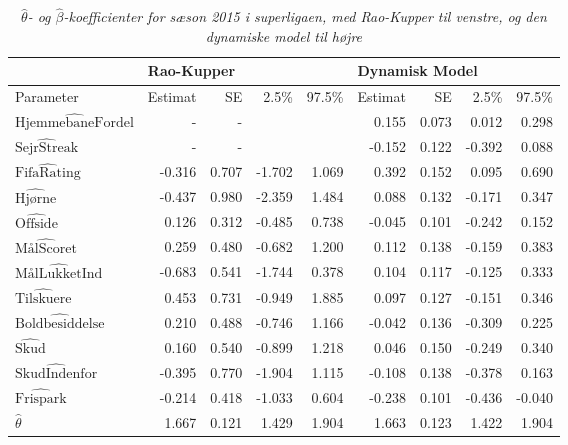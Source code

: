 \documentclass[11pt,a4paper]{article}
\begin{document}
  \begin{table}[ht]
\centering
\begin{adjustbox}{max width=\textwidth}
\begin{tabular}{|l|rrrr|rrrr|}
\hline
\multicolumn{1}{|l|}{} & \multicolumn{4}{l|}{Rao-Kupper} & \multicolumn{4}{l|}{Dynamisk Model} \\
\hline
Parameter & Estimat & SE &2.5\% &97.5\% & Estimat & SE &2.5\% &97.5\%\\
  \hline
    $\hat{\text{HjemmebaneFordel}}$ & -      & -     &      &            & 0.155 & 0.073  &0.012 & 0.298  \\
    $\hat{\text{SejrStreak}}$       & -      & -     &       &           & -0.152 & 0.122 &-0.392 & 0.088 \\
    $\hat{\text{FifaRating}}$       & -0.316 & 0.707 &-1.702 &1.069      & 0.392 & 0.152  &0.095 & 0.690 \\
    $\hat{\text{Hjørne}}$           & -0.437 & 0.980 &-2.359 &1.484      & 0.088 & 0.132  &-0.171 &0.347\\
    $\hat{\text{Offside}}$          &  0.126 & 0.312 &-0.485 &0.738      & -0.045 & 0.101 &-0.242 &0.152 \\
    $\hat{\text{MålScoret}}$        &  0.259 & 0.480 &-0.682 &1.200      & 0.112 & 0.138  &-0.159 &0.383\\
    $\hat{\text{MålLukketInd}}$     & -0.683 & 0.541 &-1.744 &0.378      & 0.104 & 0.117  &-0.125 & 0.333\\
    $\hat{\text{Tilskuere}}$        &  0.453 & 0.731 &-0.949&1.885       & 0.097 & 0.127 &-0.151 & 0.346\\
    $\hat{\text{Boldbesiddelse}}$   &  0.210 & 0.488 &-0.746 &1.166      & -0.042 & 0.136 &-0.309 & 0.225\\
    $\hat{\text{Skud}}$             &  0.160 & 0.540 &-0.899 &1.218      & 0.046 & 0.150 &-0.249 & 0.340\\
    $\hat{\text{SkudIndenfor}}$     & -0.395 & 0.770 &-1.904 &1.115      & -0.108 & 0.138 &-0.378 & 0.163\\
    $\hat{\text{Frispark}}$         & -0.214 & 0.418 &-1.033 &0.604      & -0.238 & 0.101 &-0.436 & -0.040\\
    $\hat{\theta}$                  & 1.667  & 0.121 &1.429  &1.904      & 1.663 & 0.123  & 1.422 & 1.904\\
   \hline
\end{tabular}
\end{adjustbox}
\caption{\label{tab:Parameterestimater}\textit{$\hat{\theta}$- og $\hat{\beta}$-koefficienter for sæson 2015 i superligaen, med Rao-Kupper til venstre, og den dynamiske model til højre}}
\end{table}
\end{document}
